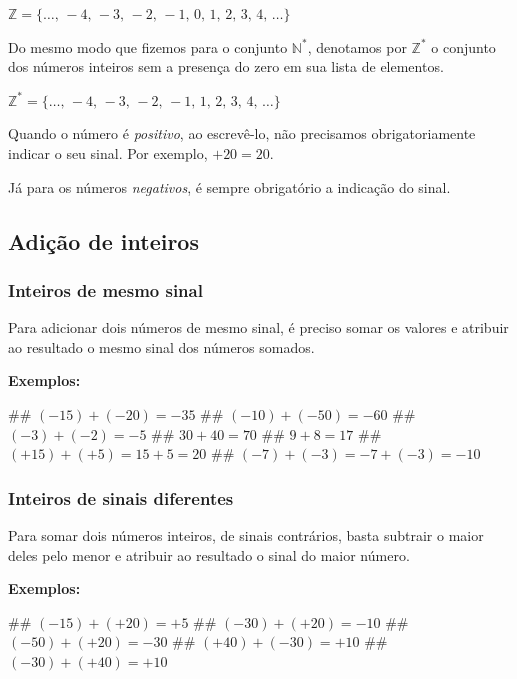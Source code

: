 \documentclass{exam}
\begin{document}
\begin{multicols*}{2}
\begin{center}
	$\mathbb{Z} = \{\ldots,\, -4,\, -3,\, -2,\, -1,\, 0,\, 1,\, 2,\, 3,\, 4,\, \ldots\}$	
\end{center}

Do mesmo modo que fizemos para o conjunto $\mathbb{N^*}$, denotamos por $\mathbb{Z^*}$ o conjunto dos números inteiros sem a presença do zero em sua lista de elementos.

\begin{center}
	$\mathbb{Z^*} = \{\ldots,\, -4,\, -3,\, -2,\, -1,\, 1,\, 2,\, 3,\, 4,\, \ldots\}$	
\end{center}


Quando o número é \textit{positivo}, ao escrevê-lo, não precisamos obrigatoriamente indicar o seu sinal. Por exemplo, $+20 = 20$.

Já para os números \textit{negativos}, é sempre obrigatório a indicação do sinal.


	\subsection{Adição de inteiros}

		\subsubsection{Inteiros de mesmo sinal}
		
		Para adicionar dois números de mesmo sinal, é preciso somar os valores e atribuir ao resultado o mesmo sinal dos números somados.
		
		\textbf{Exemplos:}
		
		\begin{easylist}[enumerate]
			## $(-15)+(-20)=-35$
			## $(-10)+(-50)=-60$
			## $(-3)+(-2)=-5$
			## $30+40=70$
			## $9+8=17$
			## $(+15)+(+5) = 15+5 = 20$
			## $(-7)+(-3)= -7+(-3)=-10$
						
		\end{easylist}
		

		\subsubsection{Inteiros de sinais diferentes}
		
		Para somar dois números inteiros, de sinais contrários, basta subtrair o maior deles pelo menor e atribuir ao resultado o sinal do maior número.
		
		\textbf{Exemplos:}
		
		\begin{easylist}[enumerate]
			## $(-15)+(+20)=+5$
			## $(-30)+(+20)=-10$
			## $(-50)+(+20)=-30$
			## $(+40)+(-30)=+10$
			## $(-30)+(+40)=+10$			
				
		\end{easylist}



	\end{multicols*}
\end{document}
